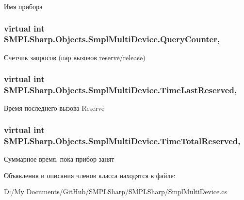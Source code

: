 Имя прибора 

\hypertarget{class_s_m_p_l_sharp_1_1_objects_1_1_smpl_multi_device_a1d76170364b223e8e36d93ae178ab915}{
\subsubsection[{Query\-Counter}]{\setlength{\rightskip}{0pt plus 5cm}virtual int S\-M\-P\-L\-Sharp.\-Objects.\-Smpl\-Multi\-Device.\-Query\-Counter\hspace{0.3cm}{\ttfamily [get]}, {\ttfamily [set]}}}\label{d8/d23/class_s_m_p_l_sharp_1_1_objects_1_1_smpl_multi_device_a1d76170364b223e8e36d93ae178ab915}


Счетчик запросов (пар вызовов reserve/release) 

\hypertarget{class_s_m_p_l_sharp_1_1_objects_1_1_smpl_multi_device_a2194a701f0588035a4d3365211a23b3b}{
\subsubsection[{Time\-Last\-Reserved}]{\setlength{\rightskip}{0pt plus 5cm}virtual int S\-M\-P\-L\-Sharp.\-Objects.\-Smpl\-Multi\-Device.\-Time\-Last\-Reserved\hspace{0.3cm}{\ttfamily [get]}, {\ttfamily [set]}}}\label{d8/d23/class_s_m_p_l_sharp_1_1_objects_1_1_smpl_multi_device_a2194a701f0588035a4d3365211a23b3b}


Время последнего вызова Reserve 

\hypertarget{class_s_m_p_l_sharp_1_1_objects_1_1_smpl_multi_device_a1d6b0142376d56ac7e2dc9bd977fe338}{
\subsubsection[{Time\-Total\-Reserved}]{\setlength{\rightskip}{0pt plus 5cm}virtual int S\-M\-P\-L\-Sharp.\-Objects.\-Smpl\-Multi\-Device.\-Time\-Total\-Reserved\hspace{0.3cm}{\ttfamily [get]}, {\ttfamily [set]}}}\label{d8/d23/class_s_m_p_l_sharp_1_1_objects_1_1_smpl_multi_device_a1d6b0142376d56ac7e2dc9bd977fe338}


Суммарное время, пока прибор занят 



Объявления и описания членов класса находятся в файле\-:\begin{DoxyCompactItemize}
\item 
D\-:/\-My Documents/\-Git\-Hub/\-S\-M\-P\-L\-Sharp/\-S\-M\-P\-L\-Sharp/Smpl\-Multi\-Device.\-cs\end{DoxyCompactItemize}

